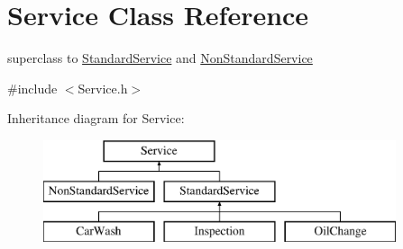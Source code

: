 \hypertarget{class_service}{}\section{Service Class Reference}
\label{class_service}


superclass to \hyperlink{class_standard_service}{Standard\+Service} and \hyperlink{class_non_standard_service}{Non\+Standard\+Service}  




{\ttfamily \#include $<$Service.\+h$>$}

Inheritance diagram for Service\+:\begin{figure}[H]
\begin{center}
\leavevmode
\includegraphics[height=3.000000cm]{class_service}
\end{center}
\end{figure}
